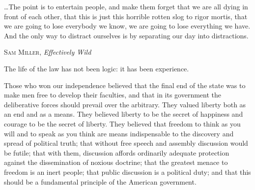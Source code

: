 \documentclass[../butidigress.tex]{subfiles}
\begin{document}
\postepi
\epigraph{\ldots The point is to entertain people, and make them forget that we are all dying in front of each other, that this is just this horrible rotten slog to rigor mortis, that we are going to lose everybody we know, we are going to lose everything we have. And the only way to distract ourselves is by separating our day into distractions.}{\textsc{Sam Miller}, \textit{Effectively Wild}}
\postepi
\epigraph{The life of the law has not been logic: it has been experience.}{}
\postepi
\epigraph{Those who won our independence believed that the final end of the state was to make men free to develop their faculties, and that in its government the deliberative forces should prevail over the arbitrary. They valued liberty both as an end and as a means. They believed liberty to be the secret of happiness and courage to be the secret of liberty. They believed that freedom to think as you will and to speak as you think are means indispensable to the discovery and spread of political truth; that without free speech and assembly discussion would be futile; that with them, discussion affords ordinarily adequate protection against the dissemination of noxious doctrine; that the greatest menace to freedom is an inert people; that public discussion is a political duty; and that this should be a fundamental principle of the American government.}{}
\end{document}
